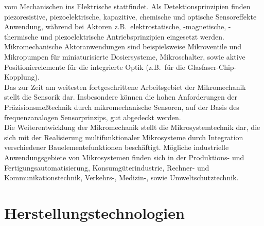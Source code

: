 vom Mechanischen ins Elektrische stattfindet.  Als
Detektionsprinzipien finden piezoresistive, piezoelektrische,
kapazitive, chemische und optische Sensoreffekte Anwendung, während bei
Aktoren z.B.\ elektrostatische, -magnetische, -thermische und
piezoelektrische Antriebsprinzipien eingesetzt werden.  Mikromechanische
Aktoranwendungen sind beispielsweise Mikroventile und Mikropumpen für
miniaturisierte Dosiersysteme, Mikroschalter, sowie aktive
Positionierelemente für die integrierte Optik (z.B.\ für die
Glasfaser-Chip-Kopplung).\\
Das zur Zeit am weitesten fortgeschrittene Arbeitsgebiet der Mikromechanik
stellt die Sensorik dar. Insbesondere können die hohen Anforderungen der
Präzisionsmeßtechnik durch mikromechanische Sensoren, auf der Basis des
frequenzanalogen Sensorprinzips, gut abgedeckt werden.\\
Die Weiterentwicklung der Mikromechanik stellt die Mikrosystemtechnik dar,
die sich mit der Realisierung multifunktionaler Mikrosysteme durch
Integration verschiedener Bauelementefunktionen beschäftigt. Mögliche
industrielle Anwendungsgebiete von Mikrosystemen finden
sich in der Produktions- und Fertigungsautomatisierung,
Konsumgüterindustrie, Rechner- und Kommunikationstechnik, Verkehrs-,
Medizin-, sowie Umweltschutztechnik.


\section{Herstellungstechnologien}
\label{herstellungstechnologien}

